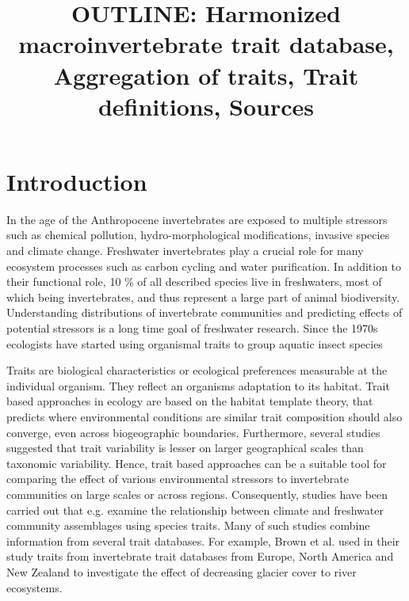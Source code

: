 \documentclass{article}
\title{ OUTLINE: Harmonized macroinvertebrate trait database, Aggregation of traits, Trait definitions, Sources }
\author{}%
\date{}%
\begin{document}
\maketitle

\section{Introduction}


In the age of the Anthropocene invertebrates are exposed to multiple stressors such 
as chemical pollution, hydro-morphological modifications, invasive species and climate change. %
Freshwater invertebrates play a crucial role for many ecosystem processes such as 
carbon cycling and water purification. In addition to their functional role, 10 \% of all 
described species live in freshwaters, most of which being invertebrates, and thus represent a
large part of animal biodiversity.
Understanding distributions of invertebrate communities and predicting effects of 
potential stressors is a long time goal of freshwater research. Since the 1970s 
ecologists have started using organismal traits to group aquatic insect species %

Traits are biological characteristics or ecological preferences measurable at the 
individual organism. %
They reflect an organisms adaptation to its habitat. Trait based approaches in 
ecology are based on the habitat template theory, that predicts where environmental conditions
are similar trait composition should also converge, even across biogeographic boundaries. %
Furthermore, several studies suggested that trait variability is lesser on larger geographical
scales than taxonomic variability. %
Hence, trait based approaches can be a suitable tool for comparing the effect of various 
environmental stressors to invertebrate communities on large scales or across regions. 
Consequently, studies have been carried out that e.g. examine the relationship between climate
and freshwater community assemblages using species traits. %
Many of such studies combine information from several trait databases. For example, 
Brown et al. used in their study traits from invertebrate trait databases from
Europe, North America and New Zealand to investigate the effect of decreasing glacier cover
to river ecosystems. %
\end{document}
